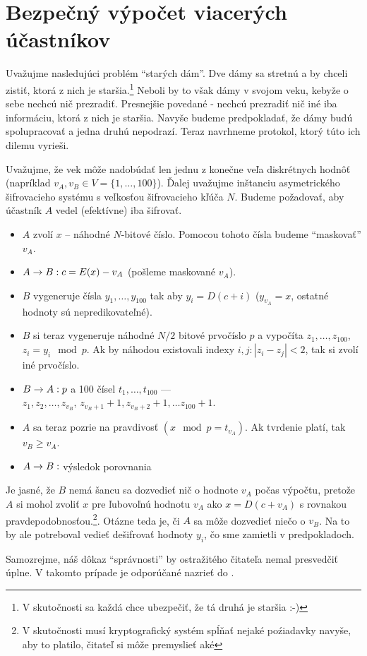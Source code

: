 \section{Bezpečný výpočet viacerých účastníkov}

Uvažujme nasledujúci problém ``starých dám''. Dve dámy sa stretnú a
by chceli zistiť, ktorá z nich je staršia.\footnote{V skutočnosti
sa každá chce ubezpečiť, že tá druhá je staršia :-)}
Neboli by to však dámy v svojom veku, kebyže o sebe nechcú nič prezradiť.
Presnejšie povedané - nechcú prezradiť nič iné iba informáciu, ktorá z
nich je staršia. Navyše budeme predpokladať, že dámy budú
spolupracovať a jedna druhú nepodrazí.
Teraz navrhneme protokol, ktorý túto ich dilemu vyrieši.

Uvažujme, že vek môže nadobúdať len jednu z konečne veľa diskrétnych
hodnôť (napríklad $v_A,v_B \in V = \{1,\dots,100\}$).
Ďalej uvažujme inštanciu asymetrického šifrovacieho systému s
veľkosťou šifrovacieho kľúča $N$. 
Budeme požadovať, aby účastník $A$ vedel (efektívne) iba šifrovať.

\begin{itemize}
    \compactlist
    \item $A$ zvolí $x$ -- náhodné $N$-bitové číslo.
        Pomocou tohoto čísla budeme ``maskovať''  $v_A$.
    \item $A \rightarrow B: c = E(x) - v_A $ (pošleme maskované $v_A$).
    \item $B$ vygeneruje čísla $y_1, \dots, y_{100}$ tak aby
            $y_i = D(c + i)$ ($y_{v_A} =x$, ostatné hodnoty
            sú nepredikovateľné).
    \item $B$ si teraz vygeneruje náhodné $N/2$ bitové prvočíslo $p$ a
    vypočíta $z_1,\dots,z_{100}$, $z_i = y_i \mod p$.
    Ak by náhodou existovali indexy $i,j: |z_i - z_j| < 2$, tak si
    zvolí iné prvočíslo.
    \item $B \rightarrow A:p$ a 100 čísel $t_1, \dots, t_{100}$ ---
        $z_1, z_2, \dots, z_{v_B}, \,
         z_{v_B+1}+1, z_{v_B+2}+1, \dots z_{100}+1$.
    \item $A$ sa teraz pozrie na pravdivosť $(x \mod p = t_{v_A})$. Ak
    tvrdenie platí, tak $v_B \ge v_A$.
    \item $A \rightarrow B:$ výsledok porovnania
\end{itemize}
Je jasné, že $B$ nemá šancu sa dozvedieť nič o hodnote $v_A$ počas
výpočtu, pretože $A$ si mohol zvoliť $x$ pre ľubovoľnú hodnotu
$v_A$ ako $x=D(c + v_A)$ s rovnakou pravdepodobnosťou.\footnote{V
skutočnosti musí kryptografický systém spĺňať nejaké poźiadavky
navyše, aby to platilo, čitateľ si môže premyslieť aké}.
Otázne teda je, či $A$ sa môže dozvedieť niečo o $v_B$.
Na to by ale potreboval vedieť dešifrovať hodnoty $y_i$, čo sme
zamietli v predpokladoch.
\begin{poznamka}
    Samozrejme, náš dôkaz ``správnosti'' by ostražitého čitateľa nemal
    presvedčiť úplne. V takomto prípade je odporúčané nazrieť do
    \cite{yao}.
\end{poznamka}


